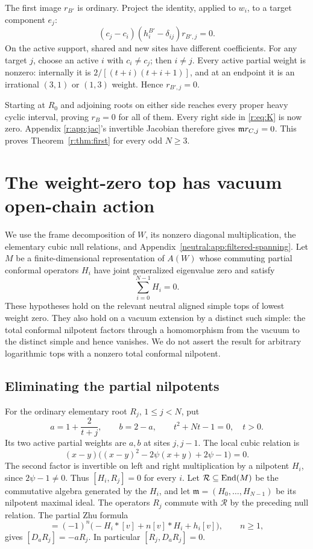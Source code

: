 \documentclass[11pt,a4paper]{article}
\numberwithin{equation}{section}
\theoremstyle{definition}\newtheorem{definition}[theorem]{Definition}
\theoremstyle{remark}\newtheorem{remark}[theorem]{Remark}
\begin{document}
The first image \(r_{B'}\) is ordinary. Project the identity,
applied to \(w_i\), to a target component \(e_j\):
\[
           (c_j-c_i)(h_i^{B'}-\delta_{ij})r_{B',j}=0.
\]
On the active support, shared and new sites have different
coefficients. For any target \(j\), choose an active \(i\) with
\(c_i\ne c_j\); then \(i\ne j\). Every active partial weight
is nonzero: internally it is \(2/[(t+i)(t+i+1)]\), and at an
endpoint it is an irrational \((3,1)\) or \((1,3)\) weight.
Hence \(r_{B',j}=0\).

Starting at \(R_0\) and adjoining roots on either side reaches
every proper heavy cyclic interval, proving \(r_B=0\) for all of
them. Every right side in \eqref{r:eq:K} is now zero. Appendix
\ref{r:app:jac}'s invertible Jacobian therefore gives
\(\mathfrak m r_{C,j}=0\). This proves Theorem~\ref{r:thm:first} for every odd \(N\ge3\).


\section{The weight-zero top has vacuum open-chain action}
\label{r:app:h0-open-chain}

We use the frame decomposition of \(W\), its nonzero diagonal
multiplication, the elementary cubic null relations, and
Appendix~\ref{neutral:app:filtered-spanning}.
Let $M$ be a finite-dimensional representation of $A(W)$ whose
commuting partial conformal operators $H_i$ have joint generalized
eigenvalue zero and satisfy
\[
 \sum_{i=0}^{N-1}H_i=0.
\]
These hypotheses hold on the relevant neutral aligned simple tops of lowest
weight zero.  They also hold on a vacuum extension by a distinct such simple:
the total conformal nilpotent factors through a homomorphism from the vacuum
to the distinct simple and hence vanishes.  We do not assert the result for
arbitrary logarithmic tops with a nonzero total conformal nilpotent.

\subsection{Eliminating the partial nilpotents}

For the ordinary elementary root $R_j$, $1\leq j<N$, put
\[
 a=1+\frac2{t+j},\qquad b=2-a,
 \qquad t^2+Nt-1=0,\quad t>0.
\]
Its two active partial weights are $a,b$ at sites $j,j-1$.
The local cubic relation is
\[
 (x-y)\bigl((x-y)^2-2\psi(x+y)+2\psi-1\bigr)=0.
\]
The second factor is invertible on left and right multiplication by a
nilpotent $H_i$, since $2\psi-1\ne0$.  Thus $[H_i,R_j]=0$ for every $i$.
Let $\mathcal R\subseteq\operatorname{End}(M)$ be the commutative algebra
generated by the $H_i$, and let $\mathfrak m=(H_0,\ldots,H_{N-1})$
be its nilpotent maximal ideal.  The operators $R_j$ commute with
$\mathcal R$ by the preceding null relation.  The partial Zhu formula
\begin{equation}
 [L_i(-n)v]=(-1)^n\bigl(-H_i*[v]+n[v]*H_i+h_i[v]\bigr),\qquad n\geq1,
 \label{r:eq:h0-partial-zhu}
\end{equation}
gives $[D_aR_j]=-aR_j$.  In particular $[R_j,D_aR_j]=0$.
\end{document}
